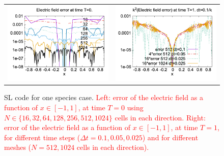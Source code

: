 \documentclass{article}
\numberwithin{equation}{section}
\newcommand{\imh}{\textheight} %
\begin{document}
\begin{figure}
	\centering
	\renewcommand{\imh}{0.45\linewidth}
	\begin{tabular}{cc}
	\includegraphics[width=\imh]{images/malkov_SL1.png} & %
	\includegraphics[width=\imh]{images/malkov_SL4.png}
	\end{tabular}
	\caption{SL code for one species case. \textcolor{red}{Left: error of the electric field as a function of $x\in [-1,1]$, at  time $T=0$ 
	using $N\in \{16,32,64,128,256,512,1024\}$ cells in each direction. 
	Right: error of the electric field as a function of $x\in[-1,1]$, at time $T=1$, for different time steps ($\Delta t=0.1, 0.05, 0.025$) 
	and for different meshes ($N=512, 1024$ cells in each direction). }}
	\label{fig:SLresult1sp}
\end{figure}
\end{document}
